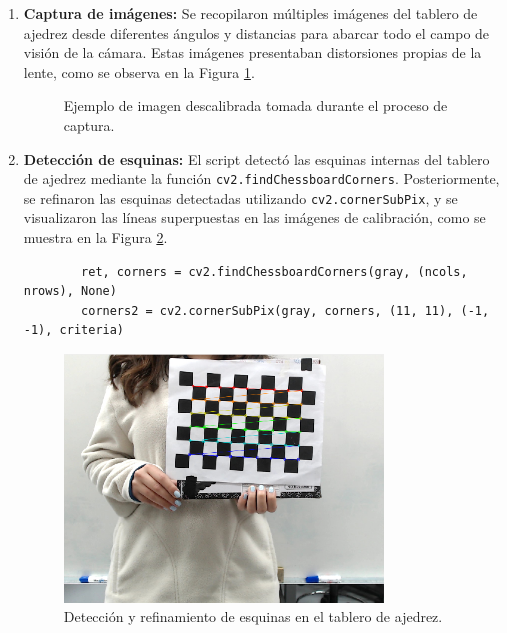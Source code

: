    \begin{enumerate}
        \item \textbf{Captura de imágenes:} 
        Se recopilaron múltiples imágenes del tablero de ajedrez desde diferentes ángulos y distancias para abarcar todo el campo de visión de la cámara. Estas imágenes presentaban distorsiones propias de la lente, como se observa en la Figura \ref{fig:imagen_descalibrada}.

        \begin{center}
            \begin{figure}[h!]
                \centering
                \caption{Ejemplo de imagen descalibrada tomada durante el proceso de captura.}
                \label{fig:imagen_descalibrada}
            \end{figure}
        \end{center}
    
        \item \textbf{Detección de esquinas:} 
        El script detectó las esquinas internas del tablero de ajedrez mediante la función \texttt{cv2.findChessboardCorners}. Posteriormente, se refinaron las esquinas detectadas utilizando \texttt{cv2.cornerSubPix}, y se visualizaron las líneas superpuestas en las imágenes de calibración, como se muestra en la Figura \ref{fig:det_ejemplos}.
        \begin{verbatim}
        ret, corners = cv2.findChessboardCorners(gray, (ncols, nrows), None)
        corners2 = cv2.cornerSubPix(gray, corners, (11, 11), (-1, -1), criteria)
        \end{verbatim}
        \begin{center}
            \begin{figure}[h!]
                \centering
                \includegraphics[width=0.8\textwidth]{pictures/calib_predictions.png}
                \caption{Detección y refinamiento de esquinas en el tablero de ajedrez.}
                \label{fig:det_ejemplos}
            \end{figure}
        \end{center}
    

\end{enumerate}
